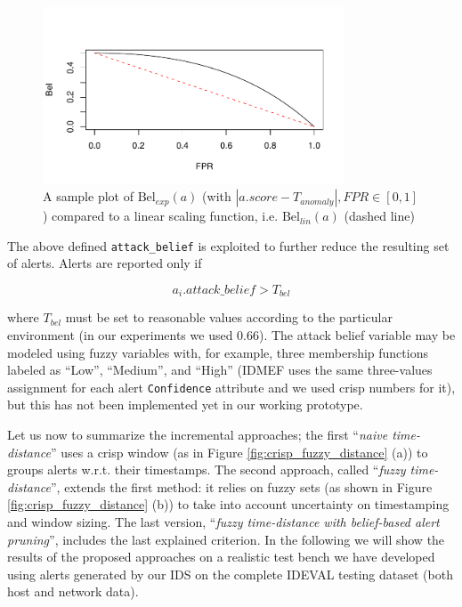 \begin{figure}[t]
  \centering
  
  \includegraphics[width=0.8\textwidth]{figures/correlation/fusion/bel_fpr}
  
  \caption{A sample plot of $\mathrm{Bel}_{exp}(a)$ (with $|a.score -
    T_{anomaly}|, FPR \in [0,1]$) compared to a linear scaling
    function, i.e. $\mathrm{Bel}_{lin}(a)$ (dashed line)}
  \label{fig:bel_fpr}
\end{figure}

The above defined \texttt{attack\_belief} is exploited to further
reduce the resulting set of alerts. Alerts are reported only if

\begin{displaymath}
  a_{i}.attack\_belief > T_{bel}
\end{displaymath}

\noindent where $T_{bel}$ must be set to reasonable values according
to the particular environment (in our experiments we used 0.66). The
attack belief variable may be modeled using fuzzy variables with, for
example, three membership functions labeled as ``Low'', ``Medium'',
and ``High'' (\ac{IDMEF} uses the same three-values
assignment for each alert \texttt{Confidence} attribute and we used
crisp numbers for it), but this has not been implemented yet in our
working prototype.

Let us now to summarize the incremental approaches; the first
``\emph{naive time-distance}'' uses a crisp window (as in Figure
\ref{fig:crisp_fuzzy_distance} (a)) to groups alerts w.r.t. their
timestamps. The second approach, called ``\emph{fuzzy
  time-distance}'', extends the first method: it relies on fuzzy sets
(as shown in Figure \ref{fig:crisp_fuzzy_distance} (b)) to take into
account uncertainty on timestamping and window sizing. The last
version, ``\emph{fuzzy time-distance with belief-based alert
  pruning}'', includes the last explained criterion. In the following
we will show the results of the proposed approaches on a realistic
test bench we have developed using alerts generated by our
\ac{IDS} on the complete \ac{IDEVAL} testing
dataset (both host and network data).

